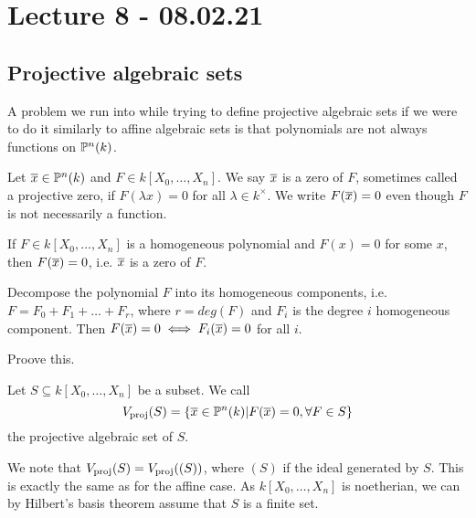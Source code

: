 
\section{Lecture 8 - 08.02.21}

\subsection{Projective algebraic sets}
A problem we run into while trying to define projective algebraic sets if we were to do it similarly to affine algebraic sets is that polynomials are not always functions on $\P^n(k)$. 

\begin{definition}
Let $\x\in \P^n(k)$ and $F\in k[X_0, \ldots, X_n]$. We say $\x$ is a zero of $F$, sometimes called a projective zero, if $F(\lambda x)=0$ for all $\lambda \in k^\times$. We write $F(\x)=0$ even though $F$ is not necessarily a function.  
\end{definition}

\begin{proposition}
If $F\in k[X_0, \ldots, X_n]$ is a homogeneous polynomial and $F(x)=0$ for some $x$, then $F(\x)=0$, i.e. $\x$ is a zero of $F$. 
\label{lec8:prop1}
\end{proposition}

\begin{proposition}
Decompose the polynomial $F$ into its homogeneous components, i.e. $F=F_0+F_1+\ldots + F_r$, where $r=deg(F)$ and $F_i$ is the degree $i$ homogeneous component. Then $F(\x)=0 \iff F_i(\x)=0$ for all $i$. 
\label{lec8:prop2}
\end{proposition}

\begin{problem}
Proove this.
\end{problem}

\begin{definition}
Let $S\subseteq k[X_0, \ldots, X_n]$ be a subset. We call 
\begin{equation*}
    \Vp(S) = \{ \x \in \P^n(k) \vert F(\x)=0, \forall F\in S \}
\end{equation*}
the projective algebraic set of $S$. 
\end{definition}

We note that $\Vp(S) = \Vp((S))$, where $(S)$ if the ideal generated by $S$. This is exactly the same as for the affine case. As $k[X_0, \ldots, X_n]$ is noetherian, we can by Hilbert's basis theorem assume that $S$ is a finite set. 

